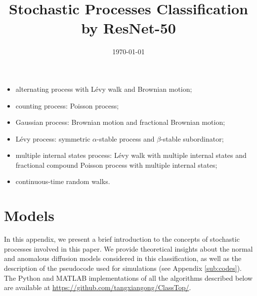 \documentclass[aps, pre, preprint, amsmath, amssymb]{revtex4}
\begin{document}
\title[Stochastic Processes Classification by ResNet-50]{Stochastic Processes Classification by ResNet-50}
%
%
\date{\today}

\begin{itemize}
	\item alternating process with L\'{e}vy walk and Brownian motion;
	\item counting process: Poisson process;
	\item Gaussian process: Brownian motion and fractional Brownian motion;
	\item L\'{e}vy process: symmetric $\alpha$-stable process and $\beta$-stable subordinator;
	\item multiple internal states process: L\'{e}vy walk with multiple internal states and fractional compound Poisson process with multiple internal states;
	\item continuous-time random walks. 
\end{itemize}
%
\tableofcontents
\appendix

\section{Models}
In this appendix, we present a brief introduction to the concepts of stochastic processes involved in this paper. 
We provide theoretical insights about the normal and anomalous diffusion models considered in this classification, as well as the description of the pseudocode used for simulations (see Appendix \ref{sub:codes}).
The Python and MATLAB implementations of all the algorithms described below are available at \url{https://github.com/tangxiangong/ClassTop/}.
\end{document}
